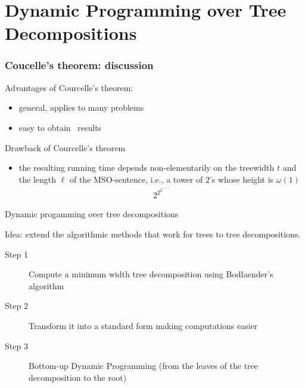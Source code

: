 \section{Dynamic Programming over Tree Decompositions}

\begin{frame}
	\frametitle{Coucelle's theorem: discussion}
	
	\noindent
	Advantages of Courcelle's theorem:
	\begin{itemize}
		\item general, applies to many problems
		\item easy to obtain \FPT\ results
	\end{itemize}
	Drawback of Courcelle's theorem
	\begin{itemize}
		\item the resulting running time depends non-elementarily on the treewidth $t$ and the length $\ell$ of the MSO-sentence, i.e., a tower of $2$'s whose height is $\omega(1)$
		\begin{align*}
		 2^{2^{2^{{\iddots}^{t+\ell}}}}
		\end{align*}
	\end{itemize}
\end{frame}

\begin{frame}{Dynamic progamming over tree decompositions}
	
	\noindent
	Idea: extend the algorithmic methods that work for trees to tree decompositions.
	
	\noindent
	\begin{description}
		\item[Step 1] Compute a minimum width tree decomposition using Bodlaender's algorithm
		\item[Step 2] Transform it into a standard form making computations easier
		\item[Step 3] Bottom-up Dynamic Programming (from the leaves of the tree decomposition to the root)
	\end{description}
\end{frame}

